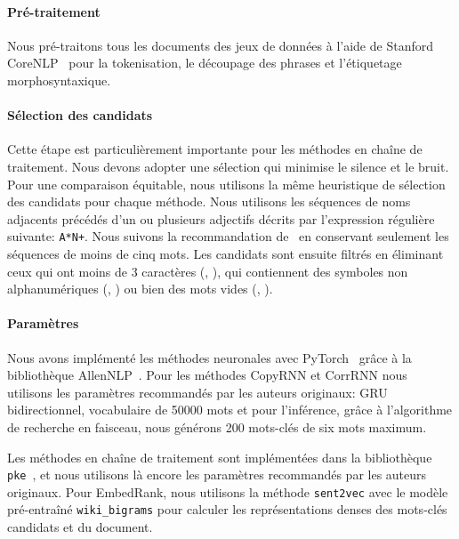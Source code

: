 \paragraph{Pré-traitement} Nous pré-traitons tous les documents des jeux de données à l'aide de Stanford CoreNLP~\cite{manning_stanford_2014} pour la tokenisation, le découpage des phrases et l'étiquetage morphosyntaxique.

\paragraph{Sélection des candidats} Cette étape est particulièrement importante pour les méthodes en chaîne de traitement. Nous devons adopter une sélection qui minimise le silence et le bruit.
%
Pour une comparaison équitable, nous utilisons la même heuristique de sélection des candidats pour chaque méthode. Nous utilisons les séquences de noms adjacents précédés d'un ou plusieurs adjectifs  décrits par l'expression régulière suivante: \texttt{A*N+}.
%
Nous suivons la recommandation de~\citet{wang_how_2014} en conservant seulement les séquences de moins de cinq mots.
%
Les candidats sont ensuite filtrés en éliminant ceux qui ont moins de 3 caractères (, ), qui contiennent des symboles non alphanumériques (, ) ou bien des mots vides (, ).

\paragraph{Paramètres}
Nous avons implémenté les méthodes neuronales avec PyTorch~\cite{paszke_pytorch_2019} grâce à la bibliothèque AllenNLP~\cite{gardner_allennlp_2018}.
Pour les méthodes CopyRNN et CorrRNN nous utilisons les paramètres recommandés par les auteurs originaux: GRU bidirectionnel, vocabulaire de \num{50 000} mots et pour l'inférence, grâce à l'algorithme de recherche en faisceau, nous générons 200 mots-clés de six mots maximum.

Les méthodes en chaîne de traitement sont implémentées dans la bibliothèque \texttt{pke}~\cite{boudin_pke_2016}, et nous utilisons là encore les paramètres recommandés par les auteurs originaux.
Pour EmbedRank, nous utilisons la méthode \texttt{sent2vec} avec le modèle pré-entraîné \texttt{wiki\_bigrams} pour calculer les représentations denses des mots-clés candidats et du document.


